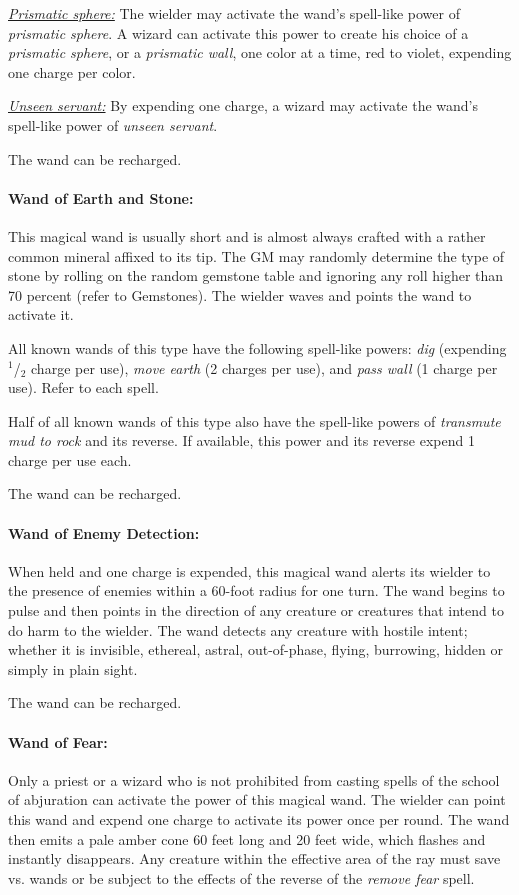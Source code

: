 \begin{multicols}{2}
\underline{\textit{Prismatic sphere:}} The wielder may activate the wand's spell-like power of \textit{prismatic sphere}.  A wizard can activate this power to create his choice of a \textit{prismatic sphere}, or a \textit{prismatic wall}, one color at a time, red to violet, expending one charge per color.

\underline{\textit{Unseen servant:}} By expending one charge, a wizard may activate the wand's spell-like power of \textit{unseen servant}.  

The wand can be recharged.
 
\paragraph{Wand of Earth and Stone:} This magical wand is usually short and is almost always crafted with a rather common mineral affixed to its tip.  The GM may randomly determine the type of stone by rolling on the random gemstone table and ignoring any roll higher than 70 percent (refer to Gemstones).  The wielder waves and points the wand to activate it.

All known wands of this type have the following spell-like powers: \textit{dig} (expending $^1$/$_2$ charge per use), \textit{move earth} (2 charges per use), and \textit{pass wall} (1 charge per use).  Refer to each spell.

Half of all known wands of this type also have the spell-like powers of \textit{transmute mud to rock} and its reverse.  If available, this power and its reverse expend 1 charge per use each.

The wand can be recharged.

\paragraph{Wand of Enemy Detection:}  When held and one charge is expended, this magical wand alerts its wielder to the presence of enemies within a 60-foot radius for one turn.  The wand begins to pulse and then points in the direction of any creature or creatures that intend to do harm to the wielder.  The wand detects any creature with hostile intent; whether it is invisible, ethereal, astral, out-of-phase, flying, burrowing, hidden or simply in plain sight.

The wand can be recharged.

\paragraph{Wand of Fear:} Only a priest or a wizard who is not prohibited from casting spells of the school of abjuration can activate the power of this magical wand.  The wielder can point this wand and expend one charge to activate its power once per round.  The wand then emits a pale amber cone 60 feet long and 20 feet wide, which flashes and instantly disappears.  Any creature within the effective area of the ray must save vs. wands or be subject to the effects of the reverse of the \textit{remove fear} spell.  


\end{multicols}
